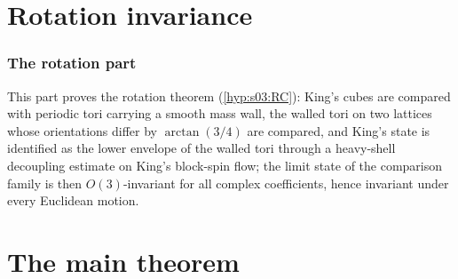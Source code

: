 \part*{Rotation invariance}
\section{The rotation part}
This part proves the rotation theorem (\cref{hyp:s03:RC}): King's cubes are compared with periodic tori carrying a smooth mass wall, the walled tori on two lattices whose orientations differ by $\arctan(3/4)$ are compared, and King's state is identified as the lower envelope of the walled tori through a heavy-shell decoupling estimate on King's block-spin flow; the limit state of the comparison family is then $O(3)$-invariant for all complex coefficients, hence invariant under every Euclidean motion.


\part*{The main theorem}







